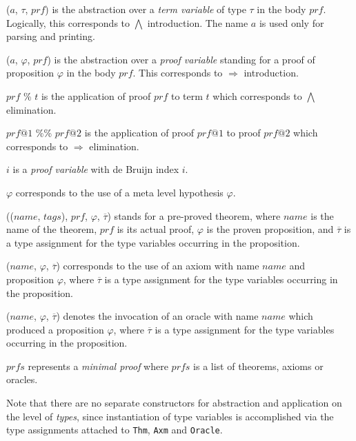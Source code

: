 \begin{ttdescription}
\item[\ttindexbold{Abst} ($a$, $\tau$, $prf$)] is the abstraction over
a {\it term variable} of type $\tau$ in the body $prf$. Logically, this
corresponds to $\bigwedge$ introduction. The name $a$ is used only for
parsing and printing.
\item[\ttindexbold{AbsP} ($a$, $\varphi$, $prf$)] is the abstraction
over a {\it proof variable} standing for a proof of proposition $\varphi$
in the body $prf$. This corresponds to $\Longrightarrow$ introduction.
\item[$prf$ \% $t$] 
is the application of proof $prf$ to term $t$
which corresponds to $\bigwedge$ elimination.
\item[$prf@1$ \%\% $prf@2$] 
is the application of proof $prf@1$ to
proof $prf@2$ which corresponds to $\Longrightarrow$ elimination.
\item[\ttindexbold{PBound} $i$] is a {\em proof variable} with de Bruijn
\cite{debruijn72} index $i$.
\item[\ttindexbold{Hyp} $\varphi$] corresponds to the use of a meta level
hypothesis $\varphi$.
\item[\ttindexbold{PThm} (($name$, $tags$), $prf$, $\varphi$, $\overline{\tau}$)]
stands for a pre-proved theorem, where $name$ is the name of the theorem,
$prf$ is its actual proof, $\varphi$ is the proven proposition,
and $\overline{\tau}$ is
a type assignment for the type variables occurring in the proposition.
\item[\ttindexbold{PAxm} ($name$, $\varphi$, $\overline{\tau}$)]
corresponds to the use of an axiom with name $name$ and proposition
$\varphi$, where $\overline{\tau}$ is a type assignment for the type
variables occurring in the proposition.
\item[\ttindexbold{Oracle} ($name$, $\varphi$, $\overline{\tau}$)]
denotes the invocation of an oracle with name $name$ which produced
a proposition $\varphi$, where $\overline{\tau}$ is a type assignment
for the type variables occurring in the proposition.
\item[\ttindexbold{MinProof} $prfs$]
represents a {\em minimal proof} where $prfs$ is a list of theorems,
axioms or oracles.
\end{ttdescription}
Note that there are no separate constructors
for abstraction and application on the level of {\em types}, since
instantiation of type variables is accomplished via the type assignments
attached to {\tt Thm}, {\tt Axm} and {\tt Oracle}.

